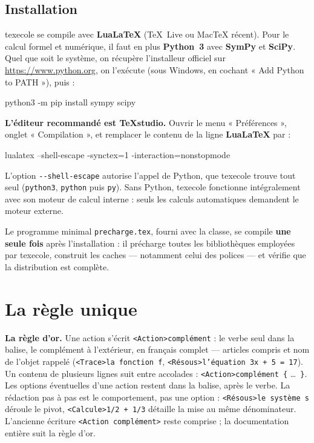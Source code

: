 \documentclass[11pt,a4paper]{article}
\newcommand{\bal}[1]{\texttt{#1}}
\newcommand{\opt}[1]{\texttt{\textcolor{Accent}{#1}}}
\begin{document}
\subsection{Installation}

texecole se compile avec \textbf{LuaLaTeX} (TeX~Live ou MacTeX récent).
Pour le calcul formel et numérique, il faut en plus \textbf{Python~3}
avec \textbf{SymPy} et \textbf{SciPy}. Quel que soit le système, on
récupère l'installeur officiel sur \url{https://www.python.org}, on
l'exécute (sous Windows, en cochant « Add Python to PATH »), puis :

\begin{code}
python3 -m pip install sympy scipy
\end{code}

\textbf{L'éditeur recommandé est TeXstudio.} Ouvrir le menu
« Préférences », onglet « Compilation », et remplacer le contenu de la
ligne \textbf{LuaLaTeX} par :

\begin{code}
lualatex --shell-escape -synctex=1 -interaction=nonstopmode %
\end{code}

L'option \opt{-{}-shell-escape} autorise l'appel de Python, que
texecole trouve tout seul (\texttt{python3}, \texttt{python} puis
\texttt{py}). Sans Python, texecole fonctionne intégralement avec son
moteur de calcul interne : seuls les calculs automatiques demandent le
moteur externe.

Le programme minimal \texttt{precharge.tex}, fourni avec la classe, se
compile \textbf{une seule fois} après l'installation : il précharge
toutes les bibliothèques employées par texecole, construit les caches
--- notamment celui des polices --- et vérifie que la distribution est
complète.

\section{La règle unique}

\textbf{La règle d'or.} Une action s'écrit \bal{<Action>complément} :
le verbe seul dans la balise, le complément à l'extérieur, en français
complet — articles compris et nom de l'objet rappelé (\bal{<Trace>la
fonction f}, \bal{<Résous>l'équation 3x + 5 = 17}). Un contenu de
plusieurs lignes suit entre accolades : \bal{<Action>complément \{}
\dots\ \bal{\}}. Les options éventuelles d'une action restent dans la
balise, après le verbe. La rédaction pas à pas est le
comportement, pas une option : \bal{<Résous>le système s} déroule le
pivot, \bal{<Calcule>1/2 + 1/3} détaille la mise au même dénominateur.
L'ancienne écriture \bal{<Action complément>}
reste comprise ; la documentation entière suit la règle d'or.
\end{document}
